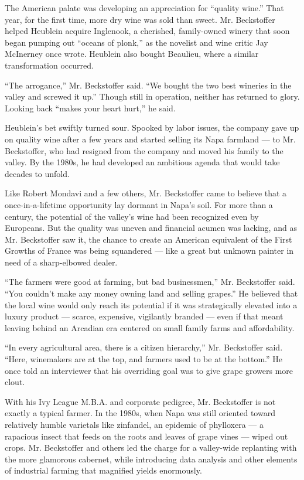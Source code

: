 The American palate was developing an appreciation for ``quality wine.''
That year, for the first time, more dry wine was sold than sweet. Mr.
Beckstoffer helped Heublein acquire Inglenook, a cherished, family-owned
winery that soon began pumping out ``oceans of plonk,'' as the novelist
and wine critic Jay McInerney once wrote. Heublein also bought Beaulieu,
where a similar transformation occurred.

``The arrogance,'' Mr. Beckstoffer said. ``We bought the two best
wineries in the valley and screwed it up.'' Though still in operation,
neither has returned to glory. Looking back ``makes your heart hurt,''
he said.

Heublein's bet swiftly turned sour. Spooked by labor issues, the company
gave up on quality wine after a few years and started selling its Napa
farmland --- to Mr. Beckstoffer, who had resigned from the company and
moved his family to the valley. By the 1980s, he had developed an
ambitious agenda that would take decades to unfold.

Like Robert Mondavi and a few others, Mr. Beckstoffer came to believe
that a once-in-a-lifetime opportunity lay dormant in Napa's soil. For
more than a century, the potential of the valley's wine had been
recognized even by Europeans. But the quality was uneven and financial
acumen was lacking, and as Mr. Beckstoffer saw it, the chance to create
an American equivalent of the First Growths of France was being
squandered --- like a great but unknown painter in need of a
sharp-elbowed dealer.

``The farmers were good at farming, but bad businessmen,'' Mr.
Beckstoffer said. ``You couldn't make any money owning land and selling
grapes.'' He believed that the local wine would only reach its potential
if it was strategically elevated into a luxury product --- scarce,
expensive, vigilantly branded --- even if that meant leaving behind an
Arcadian era centered on small family farms and affordability.

``In every agricultural area, there is a citizen hierarchy,'' Mr.
Beckstoffer said. ``Here, winemakers are at the top, and farmers used to
be at the bottom.'' He once told an interviewer that his overriding goal
was to give grape growers more clout.

With his Ivy League M.B.A. and corporate pedigree, Mr. Beckstoffer is
not exactly a typical farmer. In the 1980s, when Napa was still oriented
toward relatively humble varietals like zinfandel, an epidemic of
phylloxera --- a rapacious insect that feeds on the roots and leaves of
grape vines --- wiped out crops. Mr. Beckstoffer and others led the
charge for a valley-wide replanting with the more glamorous cabernet,
while introducing data analysis and other elements of industrial farming
that magnified yields enormously.

